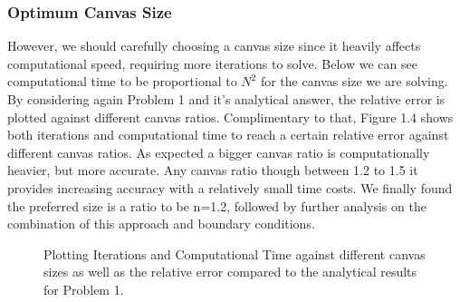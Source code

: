 \documentclass[a4paper]{article}
\begin{document}
\subsubsection{Optimum Canvas Size}
However, we should carefully choosing a canvas size since it heavily affects computational speed, requiring more iterations to solve. Below we can see computational time to be proportional to $N^2$ for the canvas size we are solving. By considering again Problem 1 and it's analytical answer, the relative error is plotted against different canvas ratios. Complimentary to that, Figure 1.4 shows both iterations and computational time to reach a certain relative error against different canvas ratios. As expected a bigger canvas ratio is computationally heavier, but more accurate. Any canvas ratio though between 1.2 to 1.5 it provides increasing accuracy with a relatively small time costs. We finally found the preferred size is a ratio to be n=1.2, followed by further analysis on the combination of this approach and boundary conditions. 

\begin{figure}[!h]
  \centering
  \hfill
  \caption{Plotting Iterations and Computational Time against different canvas sizes as well as the relative error compared to the analytical results for Problem 1. }
\label{fig:optcanv}
\end{figure}
\end{document}
